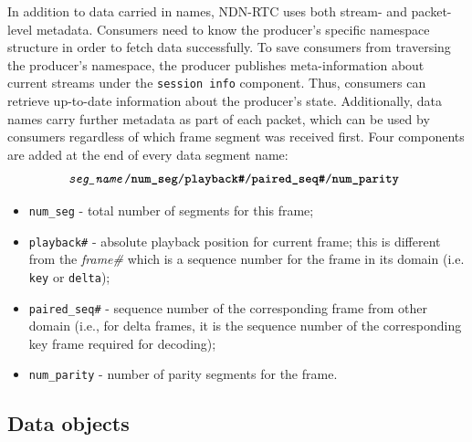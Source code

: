 \documentclass{icn/sig-alternate-2012} %
\newcommand{\ndnrtcName}{NDN-RTC} %
\begin{document}
In addition to data carried in names, \ndnrtcName{} uses both stream- and packet-level metadata. Consumers need to know the producer's specific namespace structure in order to fetch data successfully. To save consumers from traversing the producer's namespace, the producer publishes meta-information about current streams under the \texttt{session info} component. 
Thus, consumers can retrieve up-to-date information about the producer's state.
Additionally, data names carry further metadata as part of each packet, which can be used by consumers regardless of which frame segment was received first. 
Four components are added at the end of every data segment name:
\small\begin{equation}
\texttt{\textit{seg\_name}/\textbf{num\_seg}/\textbf{playback\#}/\textbf{paired\_seq\#}/\textbf{num\_parity} \nonumber}
\end{equation}\normalsize
\begin{itemize}[label={}]
\item \texttt{num\_seg} - total number of segments for this frame;
\item \texttt{playback\#} - absolute playback position for current frame; this is different from the \textit{frame\#} which is a sequence number for the frame in its domain (i.e. \texttt{key} or \texttt{delta});
\item \texttt{paired\_seq\#} - sequence number of the corresponding frame from other domain (i.e., for delta frames, it is the sequence number of the corresponding key frame required for decoding);
\item \texttt{num\_parity} - number of parity segments for the frame.
\end{itemize}


\subsection{Data objects}
\end{document}
